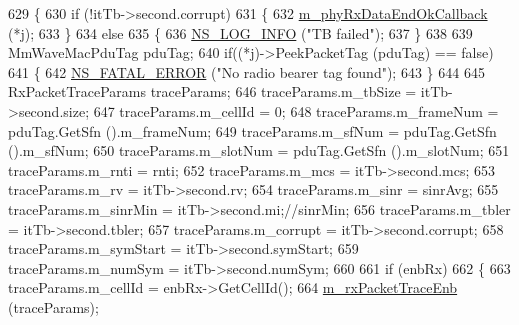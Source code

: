 \begin{DoxyCode}
629                         \{
630                                 \textcolor{keywordflow}{if} (!itTb->second.corrupt)
631                                 \{
632                                         \hyperlink{classns3_1_1MmWaveSpectrumPhy_a5a20fb20e63fa38e01bde7d517d33053}{m\_phyRxDataEndOkCallback} (*j);
633                                 \}
634                                 \textcolor{keywordflow}{else}
635                                 \{
636                                         \hyperlink{group__logging_gafbd73ee2cf9f26b319f49086d8e860fb}{NS\_LOG\_INFO} (\textcolor{stringliteral}{"TB failed"});
637                                 \}
638 
639                                 MmWaveMacPduTag pduTag;
640                                 \textcolor{keywordflow}{if}((*j)->PeekPacketTag (pduTag) == \textcolor{keyword}{false})
641                                 \{
642                                         \hyperlink{group__fatal_ga5131d5e3f75d7d4cbfd706ac456fdc85}{NS\_FATAL\_ERROR} (\textcolor{stringliteral}{"No radio bearer tag found"});
643                                 \}
644 
645                                 RxPacketTraceParams traceParams;
646                                 traceParams.m\_tbSize = itTb->second.size;
647                                 traceParams.m\_cellId = 0;
648                                 traceParams.m\_frameNum = pduTag.GetSfn ().m\_frameNum;
649                                 traceParams.m\_sfNum = pduTag.GetSfn ().m\_sfNum;
650                                 traceParams.m\_slotNum = pduTag.GetSfn ().m\_slotNum;
651                                 traceParams.m\_rnti = rnti;
652                                 traceParams.m\_mcs = itTb->second.mcs;
653                                 traceParams.m\_rv = itTb->second.rv;
654                                 traceParams.m\_sinr = sinrAvg;
655                                 traceParams.m\_sinrMin = itTb->second.mi;\textcolor{comment}{//sinrMin;}
656                                 traceParams.m\_tbler = itTb->second.tbler;
657                                 traceParams.m\_corrupt = itTb->second.corrupt;
658                                 traceParams.m\_symStart = itTb->second.symStart;
659                                 traceParams.m\_numSym = itTb->second.numSym;
660 
661                                 \textcolor{keywordflow}{if} (enbRx)
662                                 \{
663                                         traceParams.m\_cellId = enbRx->GetCellId();
664                                         \hyperlink{classns3_1_1MmWaveSpectrumPhy_ab0161a801e531b9d95230f4d464640a3}{m\_rxPacketTraceEnb} (traceParams);

\end{DoxyCode}
